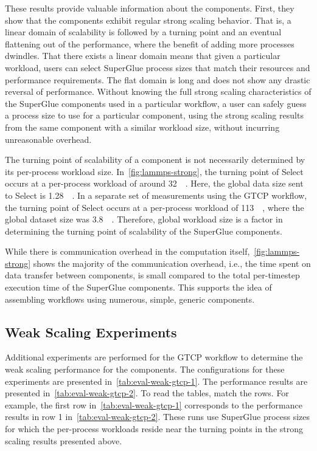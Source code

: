 \documentclass[conference]{IEEEtran}
\begin{document}
These results provide valuable information about the components.
First, they show that the components exhibit regular strong
scaling behavior. That is, 
a linear domain of scalability is followed by a turning point and an
eventual flattening out of the performance, where the benefit
of adding more processes dwindles.
That there exists a linear domain means that given
a particular workload, users can select SuperGlue process sizes
that match their resources and performance requirements.
The flat domain is long and does not show any drastic reversal
of performance. Without knowing the full strong
scaling characteristics of the SuperGlue components used in a particular workflow,
a user can safely guess a process size to use for a particular component,
using the strong scaling results from the same component with a similar
workload size, without incurring unreasonable overhead.

The turning point of scalability of a component
is not necessarily determined by
its per-process workload size.
In~\autoref{fig:lammps-strong}, the turning point of Select
occurs at a per-process workload of around \SI{32}{\mega\byte}.
Here, the global data size sent to Select
is \SI{1.28}{\giga\byte}.
In a separate set of measurements using the GTCP workflow,
the turning point of Select occurs at a per-process workload
of \SI{113}{\mega\byte}, where the global dataset size
was \SI{3.8}{\giga\byte}. Therefore, global workload size
is a factor in determining the turning point of scalability
of the SuperGlue components.

While there is communication overhead in the computation itself,~\autoref{fig:lammps-strong} shows the majority of the communication
overhead, i.e., the time spent on data transfer between components,
is small compared to the total per-timestep execution time of
the SuperGlue components. This supports the idea
of assembling workflows using numerous, simple,
generic components.

\subsection{Weak Scaling Experiments}

Additional experiments are performed for the GTCP workflow to determine the
weak scaling performance for the components. The configurations for these experiments
are presented in~\autoref{tab:eval-weak-gtcp-1}. The performance results are
presented in~\autoref{tab:eval-weak-gtcp-2}. To read the tables, match the
rows. For example, the first row in~\autoref{tab:eval-weak-gtcp-1} corresponds
to the performance results in row 1 in~\autoref{tab:eval-weak-gtcp-2}.
These runs use SuperGlue process sizes for which the per-process
workloads reside near the turning points in the
strong scaling results presented above.
\end{document}
